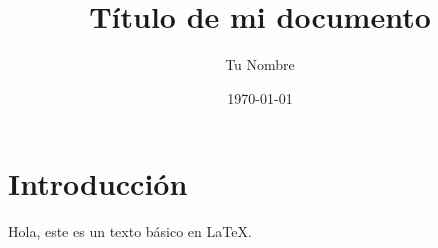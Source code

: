 \documentclass[12pt, a4paper]{article}   %
\title{Título de mi documento}           %
\author{Tu Nombre}
\date{\today}
\begin{document}

\maketitle                              %

\section{Introducción}                  %
Hola, este es un texto básico en \LaTeX.
\end{document}
